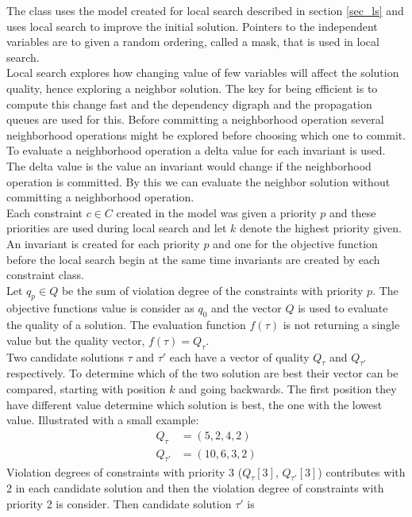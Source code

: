 The  class uses the model created for local search described in section \ref{sec_ls} and 
uses local search to improve the initial solution. Pointers to the independent variables are to given a random 
ordering, called a mask, that is used in local search. \\
Local search explores how changing value of few variables will affect the solution quality, hence exploring a neighbor 
solution. The key for being efficient is to compute this change fast and the dependency digraph and the propagation 
queues are used for this. Before committing a neighborhood operation several neighborhood operations might be explored 
before choosing which one to commit. To evaluate a neighborhood operation a delta value for each invariant is used. The 
delta value is the value an invariant would change if the neighborhood operation is committed. By this we can evaluate 
the neighbor solution without committing a neighborhood operation. \\
Each constraint $c \in C$ created in the model was given a priority $p$ and these priorities are used during local 
search and let $k$ denote the highest priority given. An invariant is created for each priority $p$ and one for the 
objective function before the local search begin at the same time invariants are created by each constraint class. \\
Let $q_p \in Q$ be the sum of violation degree of the constraints with priority $p$. The objective functions 
value is consider as $q_0$ and the vector $Q$ is used to evaluate the quality of a solution. The evaluation function 
$f(\tau)$ is not returning a single value but the quality vector, $f(\tau) = Q_\tau$.  \\ 
Two candidate solutions $\tau$ and $\tau'$ each have a vector of quality $Q_\tau$ and $Q_{\tau'}$ respectively. To 
determine which of the two solution are best their vector can be compared, starting with position $k$ and going 
backwards. The first position they have different value determine which solution is best, the one with the lowest value. 
Illustrated with a small example:
\begin{align}
 Q_\tau &= (5,2,4,2) \\ 
 Q_{\tau'} &=(10,6,3,2) 
\end{align}
Violation degrees of constraints with priority 3 ($Q_\tau[3]$, $Q_{\tau'}[3]$) contributes with 2 in each candidate 
solution and then the violation degree of constraints with priority 2 is consider. Then candidate solution $\tau'$ is 
